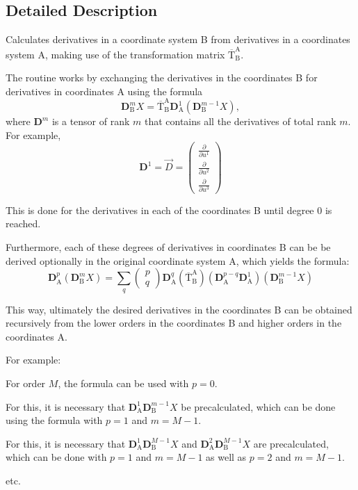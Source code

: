 \subsection{Detailed Description}
Calculates derivatives in a coordinate system B from derivatives in a coordinates system A, making use of the transformation matrix $\overline{\text{T}}_\text{B}^\text{A}$. 

The routine works by exchanging the derivatives in the coordinates B for derivatives in coordinates A using the formula \[\mathbf{D}_\text{B}^m X = \overline{\text{T}}_\text{B}^\text{A} \mathbf{D}^1_\text{A} \left(\mathbf{D}^{m-1}_\text{B} X\right) , \] where $\mathbf{D}^m$ is a tensor of rank $m$ that contains all the derivatives of total rank $m$. For example, \[\mathbf{D}^1 = \vec{D} = \left(\begin{array}{c}\frac{\partial}{\partial u^1} \\ \frac{\partial}{\partial u^2} \\ \frac{\partial}{\partial u^3} \end{array}\right) \]

This is done for the derivatives in each of the coordinates B until degree 0 is reached.

Furthermore, each of these degrees of derivatives in coordinates B can be be derived optionally in the original coordinate system A, which yields the formula\+: \[ \mathbf{D}^p_\text{A} \left(\mathbf{D}^m_\text{B} X \right) = \sum_q \left(\begin{array}{c}p\\q\end{array}\right) \mathbf{D}^q_\text{A} \left(\overline{\text{T}}_\text{B}^\text{A}\right) \left(\mathbf{D}^{p-q}_\text{A} \mathbf{D}^1_\text{A}\right) \left( \mathbf{D}^{m-1}_\text{B} X \right)\]

This way, ultimately the desired derivatives in the coordinates B can be obtained recursively from the lower orders in the coordinates B and higher orders in the coordinates A.

For example\+:
\begin{DoxyItemize}
\item For order $M$, the formula can be used with $p=0$.
\item For this, it is necessary that $\mathbf{D}^1_\text{A} \mathbf{D}^{m-1}_\text{B} X$ be precalculated, which can be done using the formula with $p=1$ and $m=M-1$.
\item For this, it is necessary that $\mathbf{D}^1_\text{A} \mathbf{D}^{M-1}_\text{B} X$ and $\mathbf{D}^2_\text{A} \mathbf{D}^{M-1}_\text{B} X$ are precalculated, which can be done with $p=1$ and $m=M-1$ as well as $p=2$ and $m=M-1$.
\item etc.
\end{DoxyItemize}

